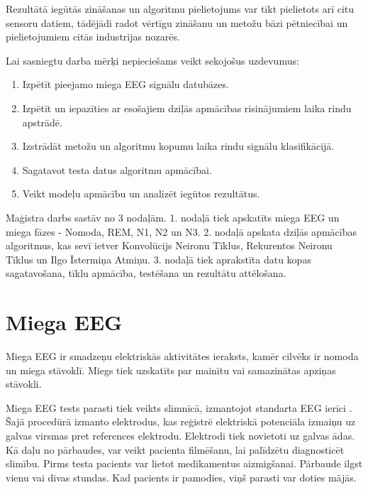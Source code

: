 \documentclass[12pt,paper=A4]{report}
\begin{document}
 Rezultātā iegūtās zināšanas un algoritmu pielietojums var tikt pielietots arī citu sensoru datiem, tādējādi radot vērtīgu zināšanu un metožu bāzi pētniecībai un pielietojumiem citās industrijas nozarēs.


Lai sasniegtu darba mērķi nepieciešams veikt sekojošus uzdevumus:
\begin{enumerate}
\item Izpētīt pieejamo miega EEG signālu datubāzes.

\item Izpētīt un iepazīties ar esošajiem dziļās apmācības risinājumiem 
laika rindu apstrādē.

\item Izstrādāt metožu un algoritmu kopumu laika rindu signālu klasifikācijā.

\item Sagatavot testa datus algoritmu apmācībai.

\item Veikt modeļu apmācību un analizēt iegūtos rezultātus.
\end{enumerate}

Maģistra darbs sastāv no 3 nodaļām. 1. nodaļā tiek apskatīts miega EEG un miega fāzes - Nomoda, REM, N1, N2 un N3. 2. nodaļā apskata dziļās apmācības algoritmus, kas sevī ietver Konvolūcijs Neironu Tīklus, Rekurentos Neironu Tīklus un Ilgo Īstermiņa Atmiņu. 3. nodaļā tiek aprakstīta datu kopas sagatavošana, tīklu apmācība, testēšana un rezultātu attēlošana.
    
    \chapter{Miega EEG}  
    Miega EEG ir smadzeņu elektriskās aktivitātes ieraksts, kamēr cilvēks ir  nomoda un miega stāvoklī. Miegs tiek uzskatīts par mainītu vai samazinātas apziņas stāvokli.
    
    Miega EEG tests parasti tiek veikts slimnīcā, izmantojot standarta EEG ierīci \cite{http://www.swbh.nhs.uk/wp-content/uploads/2012/07/What-is-a-sleep-EEG-ML3791.pdf}. Šajā procedūrā izmanto elektrodus, kas reģistrē elektriskā potenciāla izmaiņu uz galvas virsmas pret references elektrodu. Elektrodi tiek novietoti uz galvas ādas. Kā daļu no pārbaudes, var veikt pacienta filmēšanu, lai palīdzētu diagnosticēt slimību. Pirms testa pacients var lietot medikamentus aizmigšanai. Pārbaude ilgst vienu vai divas stundas. Kad pacients ir pamodies, viņš parasti var doties mājās.
\end{document}
